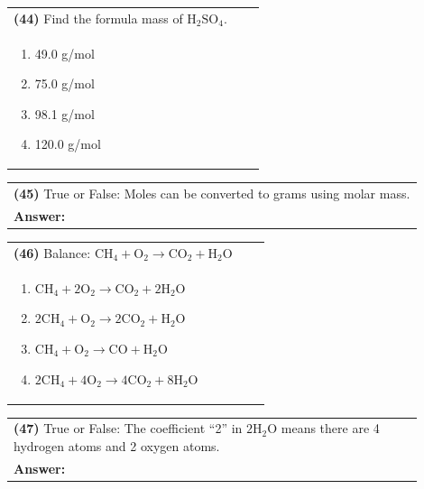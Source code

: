 \documentclass{article}
\begin{document}
{\vspace{0.2cm}
\noindent \begin{tabular}{|p{0.9\linewidth}|}
\hline
\vspace{0.2cm}
\textbf{(44)} Find the formula mass of $\mathrm{H_2SO_4}$.\\
\begin{minipage}[t]{0.85\linewidth}
\begin{enumerate}[label=\alph*.]
\item 49.0 g/mol
\item 75.0 g/mol
\item 98.1 g/mol
\item 120.0 g/mol
\end{enumerate}
\end{minipage}\\
\hline
\end{tabular}
\newpage

\vspace{0.2cm}
\noindent \begin{tabular}{|p{0.9\linewidth}|}
\hline
\vspace{0.2cm}
\textbf{(45)} True or False: Moles can be converted to grams using molar mass.\\
\textbf{Answer:} \underline{\hspace{2cm}}\\
\hline
\end{tabular}

\vspace{0.2cm}
\noindent \begin{tabular}{|p{0.9\linewidth}|}
\hline
\vspace{0.2cm}
\textbf{(46)} Balance: $\mathrm{CH_4 + O_2 \rightarrow CO_2 + H_2O}$\\
\begin{minipage}[t]{0.85\linewidth}
\begin{enumerate}[label=\alph*.]
\item $\mathrm{CH_4 + 2O_2 \rightarrow CO_2 + 2H_2O}$
\item $\mathrm{2CH_4 + O_2 \rightarrow 2CO_2 + H_2O}$
\item $\mathrm{CH_4 + O_2 \rightarrow CO + H_2O}$
\item $\mathrm{2CH_4 + 4O_2 \rightarrow 4CO_2 + 8H_2O}$
\end{enumerate}
\end{minipage}\\
\hline
\end{tabular}

\vspace{0.2cm}
\noindent \begin{tabular}{|p{0.9\linewidth}|}
\hline
\vspace{0.2cm}
\textbf{(47)} True or False: The coefficient ``2'' in $2\mathrm{H_2O}$ means there are 4 hydrogen atoms and 2 oxygen atoms.\\
\textbf{Answer:} \underline{\hspace{2cm}}\\
\hline
\end{tabular}

}
\end{document}
